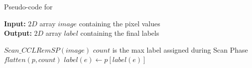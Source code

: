 \begin{algorithm}[ht!]
\small
{
	\caption{Pseudo-code for \nremsp}
	\label{alg:RemSP}
	\textbf{Input:} $2D$ array $image$ containing the pixel values \\
	\textbf{Output:} $2D$ array $label$ containing the final labels
	\begin{algorithmic}[1]
		\State $Scan\_CCLRemSP(image)$ 
		\LineComment $count$ is the max label assigned during Scan Phase
		\State $flatten(p,count)$ 
		  
			 
				\State $label(e) \gets p[label(e)]$ 
			\EndFor
		\EndFor
	\EndFunction
	\end{algorithmic}
}	
\end{algorithm}

